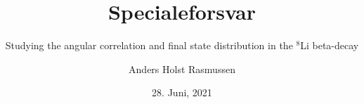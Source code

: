 \documentclass{beamer}
\title{Specialeforsvar}
\subtitle{Studying the angular correlation and final state distribution in the $^8$Li beta-decay }
\author{Anders Holst Rasmussen}
\date{28. Juni, 2021}
\begin{document}
\frame\titlepage




\end{document}
